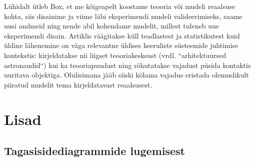 \documentclass{tufte-book}
\begin{document}
Lühidalt ütleb Box, et me kõigeapelt koostame teooria või mudeli reaalsuse kohta, siis disainime ja viime läbi eksperimendi mudeli valideerimiseks, saame uusi andmeid ning nende abil kohendame mudelit, millest tuleneb uue eksperimendi disain. Artiklis räägitakse küll teadlastest ja statistikutest kuid üldine lähenemine on  väga relevantne üldises keeruliste süsteemide juhtimise kontekstis: kirjeldatakse nii liigset teooriakesksust (vrdl. ``arhitektuursed astronaudid``) kui ka teooriapuudust ning rõhutatakse vajadust püsida kontaktis uuritava objektiga. Olulisimana jääb siiski kõlama vajadus eristada olemuslikult piiratud mudelit tema kirjeldatavast reaalsusest.  


\chapter{Lisad}
\section{Tagasisidediagrammide lugemisest}





\backmatter
\nocite{*}

 

\printindex
\end{document}
